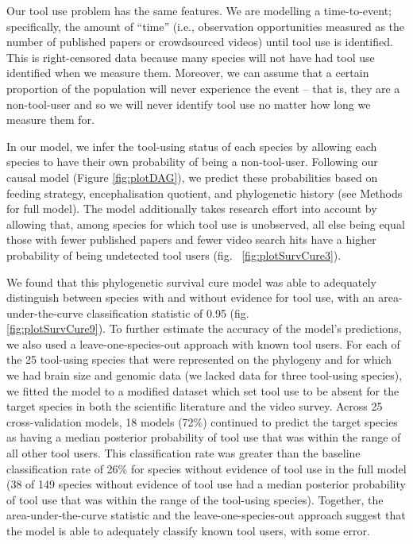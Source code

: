 \documentclass[
  man,floatsintext]{apa6}
\begin{document}
Our tool use problem has the same features. We are modelling a time-to-event;
specifically, the amount of ``time'' (i.e., observation opportunities measured as
the number of published papers or crowdsourced videos) until tool use is
identified. This is right-censored data because many species will not have had
tool use identified when we measure them. Moreover, we can assume that a certain
proportion of the population will never experience the event -- that is, they
are a non-tool-user and so we will never identify tool use no matter how long we
measure them for.

In our model, we infer the tool-using status of each species by allowing each
species to have their own probability of being a non-tool-user. Following our
causal model (Figure \ref{fig:plotDAG}), we predict these probabilities based
on feeding strategy, encephalisation quotient, and phylogenetic history (see
Methods for full model). The model additionally takes research effort into
account by allowing that, among species for which tool use is unobserved, all
else being equal those with fewer published papers and fewer video search hits
have a higher probability of being undetected tool users (fig.~
\ref{fig:plotSurvCure3}).

We found that this phylogenetic survival cure model was able to adequately
distinguish between species with and without evidence for tool use, with an
area-under-the-curve classification statistic of
0.95 (fig.\\
\ref{fig:plotSurvCure9}). To further estimate the accuracy of the model's
predictions, we also used a leave-one-species-out approach with known tool
users. For each of the 25 tool-using species that were represented on the
phylogeny and for which we had brain size and genomic data (we lacked data for
three tool-using species), we fitted the model to a modified dataset which set
tool use to be absent for the target species in both the scientific literature
and the video survey. Across 25 cross-validation models,
18 models (72\%)
continued to predict the target species as having a median posterior probability
of tool use that was within the range of all other tool users. This
classification rate was greater than the baseline classification rate of
26\%
for species without evidence of tool use in the full model
(38
of 149 species without
evidence of tool use had a median posterior probability of tool use that was
within the range of the tool-using species). Together, the area-under-the-curve
statistic and the leave-one-species-out approach suggest that the model is able
to adequately classify known tool users, with some error.
\end{document}
